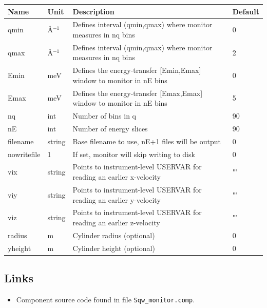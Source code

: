 \begin{longtable}{p{}p{}p{}p{}}
\toprule
\textbf{Name} & \textbf{Unit} & \textbf{Description} & \textbf{Default} \\
\midrule
\endhead
qmin & \AA{}$^{-1}$ & Defines interval (qmin,qmax) where monitor measures in nq bins & 0 \\
qmax & \AA{}$^{-1}$ & Defines interval (qmin,qmax) where monitor measures in nq bins & 2 \\
Emin & meV & Defines the energy-transfer [Emin,Emax] window to monitor in nE bins & 0 \\
Emax & meV & Defines the energy-transfer [Emax,Emax] window to monitor in nE bins & 5 \\
nq & int & Number of bins in q & 90 \\
nE & int & Number of energy slices & 90 \\
filename & string & Base filename to use, nE+1 files will be output & 0 \\
nowritefile & 1 & If set, monitor will skip writing to disk & 0 \\
vix & string & Points to instrument-level USERVAR for reading an earlier x-velocity & "" \\
viy & string & Points to instrument-level USERVAR for reading an earlier y-velocity & "" \\
viz & string & Points to instrument-level USERVAR for reading an earlier z-velocity & "" \\
radius & m & Cylinder radius (optional) & 0 \\
yheight & m & Cylinder height  (optional) & 0 \\
\bottomrule
\end{longtable}

\subsection*{Links}
\begin{itemize}
  \item Component source code found in file \texttt{Sqw\_monitor.comp}.
\end{itemize}
